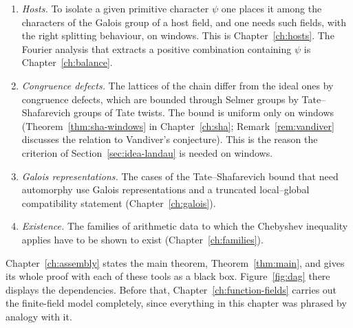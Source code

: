 \documentclass[11pt]{amsbook}
\theoremstyle{plain}
\theoremstyle{definition}
\theoremstyle{remark}
\numberwithin{equation}{section}
\numberwithin{figure}{chapter}
\numberwithin{table}{chapter}
\begin{document}
\begin{enumerate}[label=(\arabic*)]
\item \emph{Hosts.} To isolate a given primitive character $\psi$
one places it among the characters of the Galois group of a host
field, and one needs such fields, with the right splitting
behaviour, on windows. This is Chapter~\ref{ch:hosts}. The Fourier
analysis that extracts a positive combination containing $\psi$ is
Chapter~\ref{ch:balance}.
\item \emph{Congruence defects.} The lattices of the chain differ
from the ideal ones by congruence defects, which are bounded through
Selmer groups by Tate--Shafarevich groups of Tate twists. The bound
is uniform only on windows (Theorem~\ref{thm:sha-windows} in
Chapter~\ref{ch:sha}; Remark~\ref{rem:vandiver} discusses the
relation to Vandiver's conjecture). This is the reason the
criterion of Section~\ref{sec:idea-landau} is needed on windows.
\item \emph{Galois representations.} The cases of the
Tate--Shafarevich bound that need automorphy use Galois
representations and a truncated local--global compatibility
statement (Chapter~\ref{ch:galois}).
\item \emph{Existence.} The families of arithmetic data to which
the Chebyshev inequality applies have to be shown to exist
(Chapter~\ref{ch:families}).
\end{enumerate}
Chapter~\ref{ch:assembly} states the main theorem,
Theorem~\ref{thm:main}, and gives its whole proof with each of
these tools as a black box. Figure~\ref{fig:dag} there displays the
dependencies. Before that, Chapter~\ref{ch:function-fields} carries
out the finite-field model completely, since everything in this
chapter was phrased by analogy with it.
\end{document}
